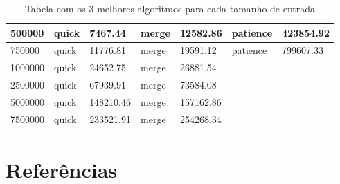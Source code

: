 \documentclass[a4paper,12pt]{scrartcl}
\begin{document}
\begin{table}[]
\begin{tabular}{|l|l|l|l|l|l|l|}
500000    & quick     & 7467.44   & merge     & 12582.86  & patience  & 423854.92 \\ \hline
750000    & quick     & 11776.81  & merge     & 19591.12  & patience  & 799607.33 \\ \hline
1000000   & quick     & 24652.75  & merge     & 26881.54  &           &           \\ \hline
2500000  & quick     & 67939.91  & merge     & 73584.08  &           &           \\ \hline
5000000  & quick     & 148210.46 & merge     & 157162.86 &           &           \\ \hline
7500000  & quick     & 233521.91 & merge     & 254268.34 &           &           \\ \hline
\end{tabular}
\caption{Tabela com os 3 melhores algoritmos para cada tamanho de entrada}
\end{table}






\newpage
\section{Referências}
\end{document}
